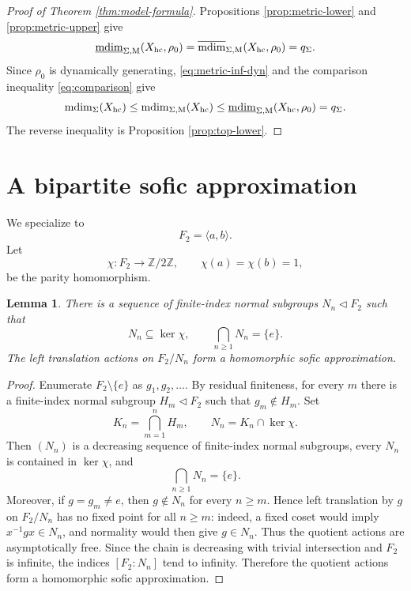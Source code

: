 \documentclass[12pt,a4paper]{amsart}
\newtheorem{lemma}[theorem]{Lemma}
\theoremstyle{definition}
\newcommand{\mdim}{\operatorname{mdim}}
\newcommand{\Z}{\mathbb Z}
\begin{document}
	\begin{proof}[Proof of Theorem \ref{thm:model-formula}]
		Propositions \ref{prop:metric-lower} and \ref{prop:metric-upper} give
		\[
		\underline{\mdim}_{\Sigma,\mathrm M}(X_{\rm hc},\rho_0)
		=\overline{\mdim}_{\Sigma,\mathrm M}(X_{\rm hc},\rho_0)
		=q_\Sigma.
		\]
		Since $\rho_0$ is dynamically generating, \eqref{eq:metric-inf-dyn} and the comparison inequality \eqref{eq:comparison} give
		\[
		\mdim_\Sigma(X_{\rm hc})
		\le \mdim_{\Sigma,\mathrm M}(X_{\rm hc})
		\le \underline{\mdim}_{\Sigma,\mathrm M}(X_{\rm hc},\rho_0)
		=q_\Sigma.
		\]
		The reverse inequality is Proposition \ref{prop:top-lower}.
	\end{proof}
	
	\section{A bipartite sofic approximation}\label{sec4}
	
	We specialize to
	\[
	F_2=\langle a,b\rangle.
	\]
	Let
	\[
	\chi:F_2\to\Z/2\Z,
	\qquad \chi(a)=\chi(b)=1,
	\]
	be the parity homomorphism.
	
	\begin{lemma}\label{lem:residual-chain}
		There is a sequence of finite-index normal subgroups $N_n\triangleleft F_2$ such that
		\[
		N_n\subseteq\ker\chi,
		\qquad
		\bigcap_{n\ge1}N_n=\{e\}.
		\]
		The left translation actions on $F_2/N_n$ form a homomorphic sofic approximation.
	\end{lemma}
	
	\begin{proof}
		Enumerate $F_2\setminus\{e\}$ as $g_1,g_2,\ldots$.  By residual finiteness, for every $m$ there is a finite-index normal subgroup $H_m\triangleleft F_2$ such that $g_m\notin H_m$.  Set
		\[
		K_n=\bigcap_{m=1}^n H_m,
		\qquad
		N_n=K_n\cap\ker\chi.
		\]
		Then $(N_n)$ is a decreasing sequence of finite-index normal subgroups, every $N_n$ is contained in $\ker\chi$, and
		\[
		\bigcap_{n\ge1}N_n=\{e\}.
		\]
		Moreover, if $g=g_m\ne e$, then $g\notin N_n$ for every $n\ge m$.  Hence left translation by $g$ on $F_2/N_n$ has no fixed point for all $n\ge m$: indeed, a fixed coset would imply $x^{-1}gx\in N_n$, and normality would then give $g\in N_n$.  Thus the quotient actions are asymptotically free.  Since the chain is decreasing with trivial intersection and $F_2$ is infinite, the indices $[F_2:N_n]$ tend to infinity.  Therefore the quotient actions form a homomorphic sofic approximation.
	\end{proof}
	
\end{document}
